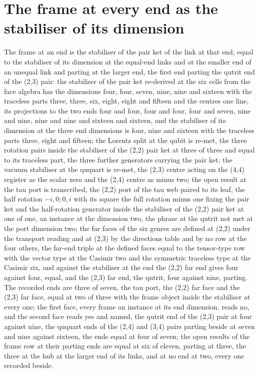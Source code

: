 \section{The frame at every end as the stabiliser of its dimension}\label{mod:IV-16-frame-at-every-end-as-the-stabiliser-of-its-dimension}
\begin{chwall}\label{box:IV-16-frame-at-every-end-as-the-stabiliser-of-its-dimension:1}
The frame at an end is the stabiliser of the pair ket of the link at that end, equal to the stabiliser of its dimension at the equal-end links and at the smaller end of an unequal link and parting at the larger end, the first end parting the qutrit end of the (2,3) pair: the stabiliser of the pair ket re-derived at the six cells from the face algebra has the dimensions four, four, seven, nine, nine and sixteen with the traceless parts three, three, six, eight, eight and fifteen and the centres one line, its projections to the two ends four and four, four and four, four and seven, nine and nine, nine and nine and sixteen and sixteen, and the stabiliser of its dimension at the three end dimensions is four, nine and sixteen with the traceless parts three, eight and fifteen; the Lorentz split at the qubit is re-met, the three rotation pairs inside the stabiliser of the (2,2) pair ket at three of three and equal to its traceless part, the three further generators carrying the pair ket; the vacuum stabiliser at the ququart is re-met, the (2,3) centre acting on the (4,4) register as the scalar zero and the (2,4) centre as minus two; the open result at the tau port is transcribed, the (2,2) port of the tau web paired to its leaf, the half rotation $-i,0;0,i$ with its square the full rotation minus one fixing the pair ket and the half-rotation generator inside the stabiliser of the (2,2) pair ket at one of one, an instance at the dimension two, the phrase at the qutrit not met at the port dimension two; the far faces of the six genres are defined at (2,2) under the transport reading and at (2,3) by the directions table and by no row at the four others, the far-end triple at the defined faces equal to the tensor-type row with the vector type at the Casimir two and the symmetric traceless type at the Casimir six, and against the stabiliser at the end the (2,2) far end gives four against four, equal, and the (2,3) far end, the qutrit, four against nine, parting. The recorded ends are three of seven, the tau port, the (2,2) far face and the (2,3) far face, equal at two of three with the frame object inside the stabiliser at every one; the first face, every frame an instance at its end dimension, reads no, and the second face reads yes and named, the qutrit end of the (2,3) pair at four against nine, the ququart ends of the (2,4) and (3,4) pairs parting beside at seven and nine against sixteen, the ends equal at four of seven; the open results of the frame row at their parting ends are equal at six of eleven, parting at three, the three at the hub at the larger end of its links, and at no end at two, every one recorded beside.

\end{chwall}

